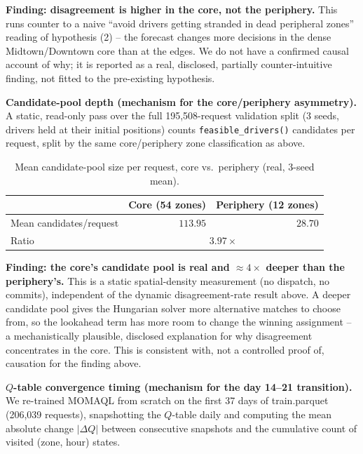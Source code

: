 \documentclass[10pt,twocolumn,a4paper]{article}
\begin{document}
\textbf{Finding: disagreement is higher in the core, not the periphery.}
This runs counter to a naive ``avoid drivers getting stranded in dead
peripheral zones'' reading of hypothesis (2) -- the forecast changes more
decisions in the dense Midtown/Downtown core than at the edges. We do not
have a confirmed causal account of why; it is reported as a real,
disclosed, partially counter-intuitive finding, not fitted to the
pre-existing hypothesis.

\textbf{Candidate-pool depth (mechanism for the core/periphery asymmetry).}
A static, read-only pass over the full 195{,}508-request validation split
(3 seeds, drivers held at their initial positions) counts
\texttt{feasible\_drivers()} candidates per request, split by the same
core/periphery zone classification as above.

\begin{table}[h!]
\centering
\caption{Mean candidate-pool size per request, core vs.\ periphery (real, 3-seed mean).}
\label{tab:poolseed}
\footnotesize
\begin{tabular}{@{}lrr@{}}
\toprule
& Core (54 zones) & Periphery (12 zones) \\
\midrule
Mean candidates/request & $113.95$ & $28.70$ \\
Ratio & \multicolumn{2}{c}{$3.97\times$} \\
\bottomrule
\end{tabular}
\end{table}

\textbf{Finding: the core's candidate pool is real and $\approx4\times$
deeper than the periphery's.} This is a static spatial-density measurement
(no dispatch, no commits), independent of the dynamic disagreement-rate
result above. A deeper candidate pool gives the Hungarian solver more
alternative matches to choose from, so the lookahead term has more room to
change the winning assignment -- a mechanistically plausible, disclosed
explanation for why disagreement concentrates in the core. This is
consistent with, not a controlled proof of, causation for the finding
above.

\textbf{$Q$-table convergence timing (mechanism for the day 14--21
transition).} We re-trained MOMAQL from scratch on the first 37 days of
train.parquet (206{,}039 requests), snapshotting the $Q$-table daily and
computing the mean absolute change $|\Delta Q|$ between consecutive
snapshots and the cumulative count of visited (zone, hour) states.
\end{document}
